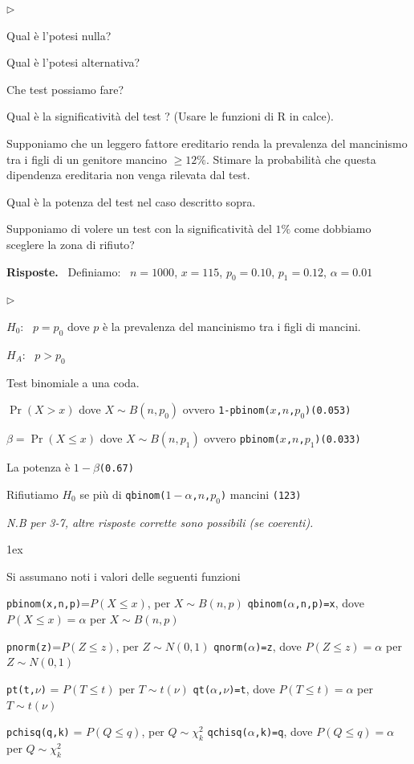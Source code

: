 \documentclass[11pt,openany]{book}
\newcommand{\mylabel}[1]{{\footnotesize\textsf{#1}}\hfill}
\renewenvironment{itemize}
  {\begin{list}{$\triangleright$}{%
   \setlength{\parskip}{0mm}
   \setlength{\topsep}{.2\baselineskip}
   \setlength{\rightmargin}{0mm}
   \setlength{\listparindent}{0mm}
   \setlength{\itemindent}{0mm}
   \setlength{\labelwidth}{3ex}
   \setlength{\itemsep}{.4\baselineskip}
   \setlength{\parsep}{0mm}
   \setlength{\partopsep}{0mm}
   \setlength{\labelsep}{1ex}
   \setlength{\leftmargin}{\labelwidth+\labelsep}
   \let\makelabel\mylabel}}{%
   \end{list}\vspace*{-1.3mm}}
\begin{document}
\begin{itemize}
\item[1.] Qual è l'potesi nulla?

\item[2.] Qual è l'potesi alternativa?

\item[3.] Che test possiamo fare?

\item[4.] Qual è la significatività del test ? (Usare le funzioni di R in calce).

\item[5.] Supponiamo che un leggero fattore ereditario renda la prevalenza del mancinismo tra i figli di un genitore mancino $\ge12\%$. Stimare la probabilità che questa dipendenza ereditaria non venga rilevata dal test. 

\item[6.] Qual è la potenza del test nel caso descritto sopra.

\item[7.] Supponiamo di volere un test con la significatività del $1\%$ come dobbiamo sceglere la zona di rifiuto?
\end{itemize}

\textbf{Risposte.} \ Definiamo: \ $n=1000$,\hfil
$x=115$,\hfil
$p_0=0.10$,\hfil
$p_1=0.12$,\hfil
$\alpha=0.01$\hfil

\begin{itemize}
\item[1.] $H_0$: \ $p=p_0$ dove $p$ è la prevalenza del mancinismo tra i figli di mancini.
\item[2.] $H_A$: \ $p>p_0$ 
\item[3.] Test binomiale a una coda.
\item[4.] $\Pr(X> x)$ dove $X\sim B(n,p_0)$ ovvero {\tt 1-pbinom($x$,$n$,$p_0$)}\hfill {\tt(0.053)}
\item[5.] $\beta=\Pr(X\le x)$ dove $X\sim B(n,p_1)$ ovvero {\tt pbinom($x$,$n$,$p_1$)}\hfill {\tt (0.033)}
\item[6.]  La potenza è $1-\beta$\hfill {\tt (0.67)}
\item[7.]  Rifiutiamo $H_0$ se più di {\tt qbinom($1-\alpha$,$n$,$p_0$)} mancini \hfill {\tt (123)}
\end{itemize}

\textit{N.B per 3-7, altre risposte corrette sono possibili (se coerenti).}

\parskip1ex
{\hrulefill\scriptsize

Si assumano noti i valori delle seguenti funzioni

{\tt pbinom(x,n,p)}=$P(X\le x)$, per $X\sim B(n,p)$
\hfill 
{\tt qbinom($\alpha$,n,p)=x},  dove $P(X\le x)=\alpha$ per $X\sim B(n,p)$

{\tt pnorm(z)}=$P(Z\le z)$, per $Z\sim N(0,1)$
\hfill 
{\tt qnorm($\alpha$)=z},  dove $P(Z\le z)=\alpha$ per $Z\sim N(0,1)$

{\tt pt(t,$\nu$)} = $P(T\le t)$ per $T\sim t(\nu)$
\hfill
{\tt qt($\alpha$,$\nu$)=t}, dove $P(T\le t)=\alpha$ per $T\sim t(\nu)$

{\tt pchisq(q,k)} = $P(Q\le q)$, per $Q\sim \chi^2_k$
\hfill
{\tt qchisq($\alpha$,k)=q},  dove $P(Q\le q)=\alpha$ per $Q\sim \chi^2_k$
\par
}
\end{document}
